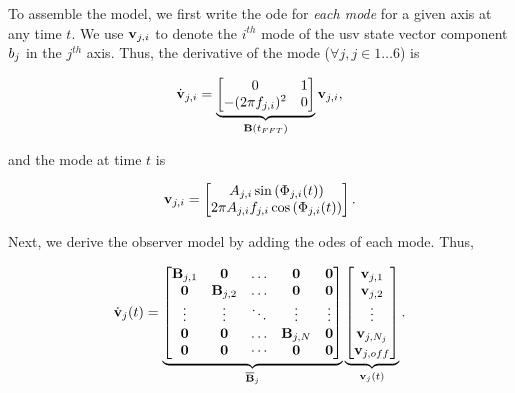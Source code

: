 \documentclass[letterpaper, 10 pt, journal, twoside]{IEEEtran}
\begin{document}
To assemble the model, we first write the \ac{ode} for \textit{each mode} for a given axis at any time $t$. We use $\mathbf{v}_{j,i}$ to denote the $i^{th}$ mode of the \ac{usv} state vector component $b_j$ in the $j^{th}$ axis. Thus, the derivative of the mode ($\forall j, j \in {1\ldots 6}$) is
\begin{small}
\begin{equation}
    \dot{\mathbf{v}}_{j,i} = \underbrace{\begin{bmatrix}
    0 & 1\\
    -(2\pi f_{j,i})^2 & 0\\
    \end{bmatrix}}_{\mathbf{B}(t_{FFT})} \mathbf{v}_{j,i},
\end{equation}
\end{small}

\noindent and the mode at time $t$ is
\begin{small}
\begin{equation} \label{eq:statevector}
    \mathbf{v}_{j,i} = \begin{bmatrix}
    A_{j,i} \sin{(\Phi_{j,i}(t))} \\
    2\pi A_{j,i}f_{j,i}\cos{(\Phi_{j,i}(t))}
    \end{bmatrix}.
\end{equation}
\end{small}

Next, we derive the observer model by adding the \acp{ode} of each mode. Thus,
\begin{small}
\begin{equation}
    \dot{\mathbf{v}}_j(t) = \underbrace{\begin{bmatrix}
    \mathbf{B}_{j,1} & \mathbf{0} & \ldots & \mathbf{0} & \mathbf{0} \\
    \mathbf{0} & \mathbf{B}_{j,2} & \ldots & \mathbf{0} & \mathbf{0} \\
    \vdots & \vdots & \ddots & \vdots & \vdots \\
    \mathbf{0} & \mathbf{0} & \ldots & \mathbf{B}_{j,N} & \mathbf{0}\\
    \mathbf{0} & \mathbf{0} & \cdots & \mathbf{0} & \mathbf{0}\\
    \end{bmatrix}}_{\overline{\mathbf{B}}_j}
    \underbrace{
    \begin{bmatrix}
    \mathbf{v}_{j,1} \\
    \mathbf{v}_{j,2} \\
    \vdots \\
    \mathbf{v}_{j,N_j} \\
    \mathbf{v}_{j,off} \\
    \end{bmatrix}}_{\mathbf{v}_j(t)}.
\end{equation}
\end{small}
\end{document}

